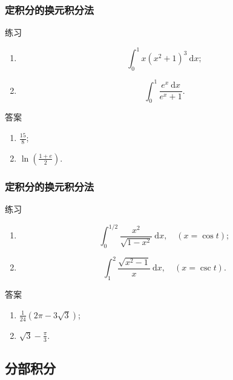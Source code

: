 \documentclass[
10pt,
aspectratio=43,
]{beamer}
\begin{document}
\begin{frame}
	\frametitle{定积分的换元积分法}
	\everymath{\displaystyle}
	\begin{block}{练习}
		\begin{enumerate}
			\item
			      $$
				      \int_0^1 x\left(x^2+1\right)^3 \mathrm{~d} x;
			      $$
			\item
			      $$
				      \int_0^1 \frac{e^x \mathrm{~d} x}{e^x+1}.
			      $$
		\end{enumerate}
	\end{block}
	\pause
	\begin{exampleblock}{答案}
		\begin{enumerate}[<+->]
			\item $\frac{15}{8}$;\vspace{0.5cm}
			\item $\ln \left(\frac{1+e}{2}\right)$.
		\end{enumerate}
	\end{exampleblock}
\end{frame}

\begin{frame}
	\frametitle{定积分的换元积分法}
	\everymath{\displaystyle}
	\begin{block}{练习}
		\begin{enumerate}
			\item
			      $$
				      \int_0^{1 / 2} \frac{x^2}{\sqrt{1-x^2}} \mathrm{~d} x,\quad (x=\cos t);
			      $$
			\item
			      $$
				      \int_1^2 \frac{\sqrt{x^2-1}}{x} \mathrm{~d} x,\quad (x=\csc t).
			      $$
		\end{enumerate}
	\end{block}
	\pause
	\begin{exampleblock}{答案}
		\begin{enumerate}[<+->]
			\item $\frac{1}{24} \left(2 \pi -3 \sqrt{3}\right)$;\vspace{0.5cm}
			\item $\sqrt{3}-\frac{\pi }{3}$.
		\end{enumerate}
	\end{exampleblock}
\end{frame}

\subsection{分部积分}
\end{document}
